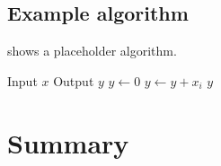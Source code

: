 \subsection{Example algorithm}
 shows a placeholder algorithm.

\begin{algorithm}[htbp]
  \caption{Example algorithm}
  \begin{algorithmic}[1]
    \Require Input $x$
    \Ensure Output $y$
    \State $y \gets 0$
      \State $y \gets y + x_i$
    \EndFor
    \State \Return $y$
  \end{algorithmic}
\end{algorithm}

\section{Summary}
\lipsum[3]
